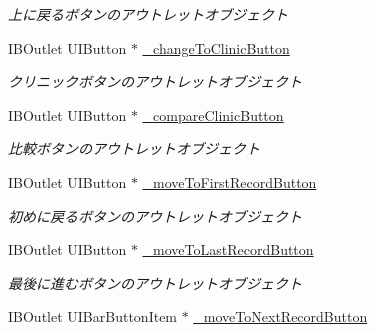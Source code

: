 \begin{DoxyCompactItemize}
\begin{DoxyCompactList}\small\item\em 上に戻るボタンのアウトレットオブジェクト \end{DoxyCompactList}\item 
\hypertarget{interface_abstract_record_view_controller_ad9e9358af1d5b00add9326ad42445b28}{
IBOutlet UIButton $\ast$ \hyperlink{interface_abstract_record_view_controller_ad9e9358af1d5b00add9326ad42445b28}{\_\-changeToClinicButton}}
\label{interface_abstract_record_view_controller_ad9e9358af1d5b00add9326ad42445b28}

\begin{DoxyCompactList}\small\item\em クリニックボタンのアウトレットオブジェクト \end{DoxyCompactList}\item 
\hypertarget{interface_abstract_record_view_controller_a800aaf69a6d1ddc48e53713db3e6e82d}{
IBOutlet UIButton $\ast$ \hyperlink{interface_abstract_record_view_controller_a800aaf69a6d1ddc48e53713db3e6e82d}{\_\-compareClinicButton}}
\label{interface_abstract_record_view_controller_a800aaf69a6d1ddc48e53713db3e6e82d}

\begin{DoxyCompactList}\small\item\em 比較ボタンのアウトレットオブジェクト \end{DoxyCompactList}\item 
\hypertarget{interface_abstract_record_view_controller_a5eae56a73770a200995c407f60da2fe2}{
IBOutlet UIButton $\ast$ \hyperlink{interface_abstract_record_view_controller_a5eae56a73770a200995c407f60da2fe2}{\_\-moveToFirstRecordButton}}
\label{interface_abstract_record_view_controller_a5eae56a73770a200995c407f60da2fe2}

\begin{DoxyCompactList}\small\item\em 初めに戻るボタンのアウトレットオブジェクト \end{DoxyCompactList}\item 
\hypertarget{interface_abstract_record_view_controller_a1650b6eee98b02c083540cbd5bb4625e}{
IBOutlet UIButton $\ast$ \hyperlink{interface_abstract_record_view_controller_a1650b6eee98b02c083540cbd5bb4625e}{\_\-moveToLastRecordButton}}
\label{interface_abstract_record_view_controller_a1650b6eee98b02c083540cbd5bb4625e}

\begin{DoxyCompactList}\small\item\em 最後に進むボタンのアウトレットオブジェクト \end{DoxyCompactList}\item 
\hypertarget{interface_abstract_record_view_controller_a0420fc592460a6ae28de1fc7bef20cc6}{
IBOutlet UIBarButtonItem $\ast$ \hyperlink{interface_abstract_record_view_controller_a0420fc592460a6ae28de1fc7bef20cc6}{\_\-moveToNextRecordButton}}
\label{interface_abstract_record_view_controller_a0420fc592460a6ae28de1fc7bef20cc6}


\end{DoxyCompactItemize}
